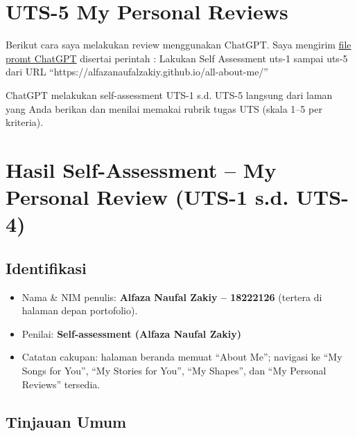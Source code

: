 \documentclass[
  letterpaper,
  DIV=11,
  numbers=noendperiod]{scrreprt}
\providecommand{\tightlist}{%
  \setlength{\itemsep}{0pt}\setlength{\parskip}{0pt}}
\begin{document}

\chapter{UTS-5 My Personal Reviews}\label{uts-5-my-personal-reviews}

Berikut cara saya melakukan review menggunakan ChatGPT. Saya mengirim
\href{skor_uts.pdf}{file promt ChatGPT} disertai perintah : Lakukan Self
Assessment uts-1 sampai uts-5 dari URL
``https://alfazanaufalzakiy.github.io/all-about-me/''

ChatGPT melakukan self-assessment UTS-1 s.d. UTS-5 langsung dari laman
yang Anda berikan dan menilai memakai rubrik tugas UTS (skala 1--5 per
kriteria).


\chapter*{Hasil Self-Assessment -- My Personal Review (UTS-1 s.d.
UTS-4)}\label{hasil-self-assessment-my-personal-review-uts-1-s.d.-uts-4}


\section{Identifikasi}\label{identifikasi}

\begin{itemize}
\tightlist
\item
  Nama \& NIM penulis: \textbf{Alfaza Naufal Zakiy -- 18222126} (tertera
  di halaman depan portofolio).
\item
  Penilai: \textbf{Self-assessment (Alfaza Naufal Zakiy)}
\item
  Catatan cakupan: halaman beranda memuat ``About Me''; navigasi ke ``My
  Songs for You'', ``My Stories for You'', ``My Shapes'', dan ``My
  Personal Reviews'' tersedia.
\end{itemize}

\section{Tinjauan Umum}\label{tinjauan-umum}
\end{document}
